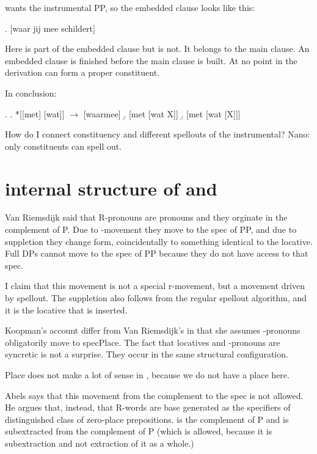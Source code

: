 \documentclass{article}
\begin{document}
 wants the instrumental PP, so the embedded clause looks like this:

\ex. [waar jij mee schildert]

Here  is part of the embedded clause but  is not. It belongs to the main clause. An embedded clause is finished before the main clause is built. At no point in the derivation can   form a proper constituent.



In conclusion:

\ex.
\a. *[[met] [wat]] $\rightarrow$ [waarmee]
\b. [met [wat X]]
\b. [met [wat [X]]]



How do I connect constituency and different spellouts of the instrumental? Nano: only constituents can spell out.









\section{internal structure of  and }





Van Riemsdijk said that R-pronouns are pronouns and they orginate in the complement of P. Due to -movement they move to the spec of PP, and due to suppletion they change form, coincidentally to something identical to the locative. Full DPs cannot move to the spec of PP because they do not have access to that spec.

I claim that this movement is not a special r-movement, but a movement driven by spellout. The suppletion also follows from the regular spellout algorithm, and it is the locative that is inserted.


Koopman's account differ from Van Riemsdijk's in that she assumes -pronouns obligatorily move to specPlace. The fact that locatives and -pronouns are syncretic is not a surprise. They occur in the same structural configuration.

Place does not make a lot of sense in , because we do not have a place here.

Abels says that this movement from the complement to the spec is not allowed. He argues that, instead, that R-words are base generated as the specifiers of distinguished class of zero-place prepositions.  is the complement of P and is subextracted from the complement of P (which is allowed, because it is subextraction and not extraction of it as a whole.)
\end{document}
